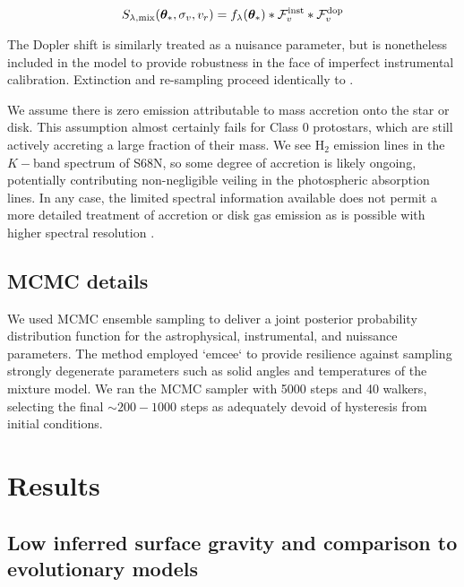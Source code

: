 \documentclass[twocolumn]{emulateapj}%
\begin{document}
\begin{equation} \label{eqn:broadening}
S_{\lambda, \mathrm{mix}}(\vt_{\ast}, \sigma_v, v_r) = \flam(\vt_{\ast}) \ast \mathcal{F}_v^{\rm inst} \ast \mathcal{F}_v^{\rm dop}
\end{equation} 

The Dopler shift is similarly treated as a nuisance parameter, but is nonetheless included in the model to provide robustness in the face of imperfect instrumental calibration.  Extinction and re-sampling proceed identically to \citet{czekala15}.

We assume there is zero emission attributable to mass accretion onto the star or disk.  This assumption almost certainly fails for Class 0 protostars, which are still actively accreting a large fraction of their mass.  We see H$_2$ emission lines in the $K-$band spectrum of S68N, so some degree of accretion is likely ongoing, potentially contributing non-negligible veiling in the photospheric absorption lines.  In any case, the limited spectral information available does not permit a more detailed treatment of accretion or disk gas emission as is possible with higher spectral resolution \citep[][\emph{e.g.}]{2016ApJ...826..179L}.  

\subsection{MCMC details}

We used MCMC ensemble sampling to deliver a joint posterior probability distribution function for the astrophysical, instrumental, and nuissance parameters.  The method employed `emcee` \citep{foreman13} to provide resilience against sampling strongly degenerate parameters such as solid angles and temperatures of the mixture model.  We ran the MCMC sampler with 5000 steps and 40 walkers, selecting the final $\sim200-1000$ steps as adequately devoid of hysteresis from initial conditions.

\section{Results}

\subsection{Low inferred surface gravity and comparison to evolutionary models}
\end{document}
